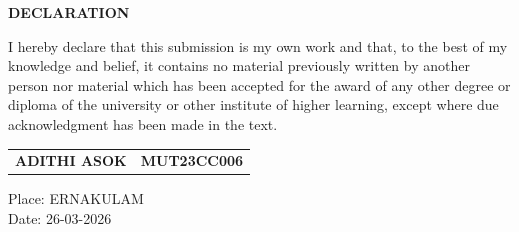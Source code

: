 \documentclass[a4paper,12pt,oneside]{report}
\begin{document}
\begin{titlepage}
{\scshape \centering \Large \bfseries DECLARATION \par}
\vspace{1.5cm}
{I hereby declare that this submission is my own work and that, to the best of my knowledge and belief, it contains no material previously written by another person nor material which has been accepted for the award of any other degree or diploma of the university or other institute of higher learning, except where due acknowledgment has been made in the text.}
\vspace{2cm}
\begin{flushright}
\begin{tabular}{lr}
\textbf{ADITHI ASOK} & \textbf{MUT23CC006} \\
\end{tabular}
\end{flushright}
\par

\vfill
\noindent Place: ERNAKULAM\\
\noindent Date: 26-03-2026
\end{titlepage}
\end{document}

